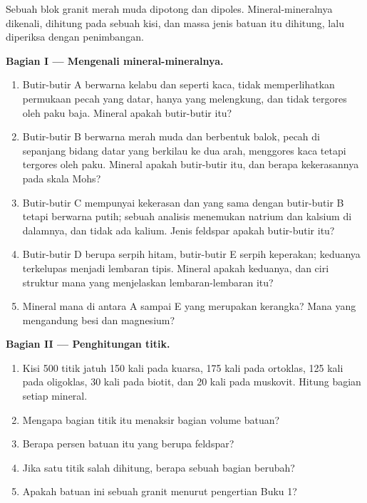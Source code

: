\begin{problem}
\label{pb:g11:minerals:1}
Sebuah blok granit merah muda dipotong dan dipoles. Mineral-mineralnya dikenali,
dihitung pada sebuah kisi, dan massa jenis batuan itu dihitung, lalu diperiksa
dengan penimbangan.

\medskip
\noindent\textbf{Bagian I --- Mengenali mineral-mineralnya.}
\begin{enumerate}
  \item Butir-butir A berwarna kelabu dan seperti kaca, tidak memperlihatkan
        permukaan pecah yang datar, hanya yang melengkung, dan tidak tergores
        oleh paku baja. Mineral apakah butir-butir itu?
  \item Butir-butir B berwarna merah muda dan berbentuk balok, pecah di
        sepanjang bidang datar yang berkilau ke dua arah, menggores kaca tetapi
        tergores oleh paku. Mineral apakah butir-butir itu, dan berapa
        kekerasannya pada skala Mohs?
  \item Butir-butir C mempunyai kekerasan dan  yang sama dengan
        butir-butir B tetapi berwarna putih; sebuah analisis menemukan natrium
        dan kalsium di dalamnya, dan tidak ada kalium. Jenis feldspar apakah
        butir-butir itu?
  \item Butir-butir D berupa serpih hitam, butir-butir E serpih keperakan;
        keduanya terkelupas menjadi lembaran tipis. Mineral apakah keduanya, dan
        ciri struktur mana yang menjelaskan lembaran-lembaran itu?
  \item Mineral mana di antara A sampai E yang merupakan  kerangka? Mana
        yang mengandung besi dan magnesium?
\end{enumerate}

\medskip
\noindent\textbf{Bagian II --- Penghitungan titik.}
\begin{enumerate}[resume]
  \item Kisi 500 titik jatuh 150 kali pada kuarsa, 175 kali pada ortoklas,
        125 kali pada oligoklas, 30 kali pada biotit, dan 20 kali pada
        muskovit. Hitung bagian setiap mineral.
  \item Mengapa bagian titik itu menaksir bagian volume
        batuan?
  \item Berapa persen batuan itu yang berupa feldspar?
  \item Jika satu titik salah dihitung, berapa sebuah bagian berubah?
  \item Apakah batuan ini sebuah granit menurut pengertian Buku 1?
\end{enumerate}


\end{problem}
